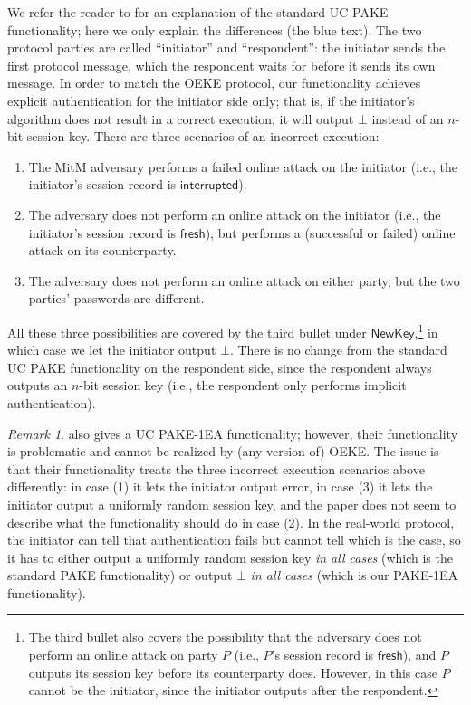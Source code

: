 \documentclass{article}
\theoremstyle{plain}
\theoremstyle{definition}
\theoremstyle{remark}
\newtheorem{remark}{Remark}
\newcommand{\NewKey}{\mathsf{NewKey}}
\newcommand{\fresh}{\mathsf{fresh}}
\newcommand{\interrupted}{\mathsf{interrupted}}
\begin{document}
We refer the reader to \cite[Section~2.1]{EPRINT:Xu25} for an explanation of the standard UC PAKE functionality; here we only explain the differences (the {\color{blue}blue} text). The two protocol parties are called ``initiator'' and ``respondent'': the initiator sends the first protocol message, which the respondent waits for before it sends its own message. In order to match the OEKE protocol, our functionality achieves explicit authentication for the initiator side only; that is, if the initiator's algorithm does not result in a correct execution, it will output $\bot$ instead of an $n$-bit session key. There are three scenarios of an incorrect execution:
\begin{enumerate}
  \item The MitM adversary performs a failed online attack on the initiator (i.e., the initiator's session record is $\interrupted$).
  \item The adversary does not perform an online attack on the initiator (i.e., the initiator's session record is $\fresh$), but performs a (successful or failed) online attack on its counterparty.
  \item The adversary does not perform an online attack on either party, but the two parties' passwords are different.
\end{enumerate}
All these three possibilities are covered by the third bullet under $\NewKey$,\footnote{The third bullet also covers the possibility that the adversary does not perform an online attack on party $P$ (i.e., $P$'s session record is $\fresh$), and $P$ outputs its session key before its counterparty does. However, in this case $P$ cannot be the initiator, since the initiator outputs after the respondent.} in which case we let the initiator output $\bot$. There is no change from the standard UC PAKE functionality on the respondent side, since the respondent always outputs an $n$-bit session key (i.e., the respondent only performs implicit authentication).
\begin{remark}
\label{rem:ocake}
\cite[Fig.4]{ACNS:BCPRR23} also gives a UC PAKE-1EA functionality; however, their functionality is problematic and cannot be realized by (any version of) OEKE. The issue is that their functionality treats the three incorrect execution scenarios above differently: in case (1) it lets the initiator output \textsf{error}, in case (3) it lets the initiator output a uniformly random session key, and the paper does not seem to describe what the functionality should do in case (2). In the real-world protocol, the initiator can tell that authentication fails but cannot tell which is the case, so it has to either output a uniformly random session key \emph{in all cases} (which is the standard PAKE functionality) or output $\bot$ \emph{in all cases} (which is our PAKE-1EA functionality).
\end{remark}
\end{document}
